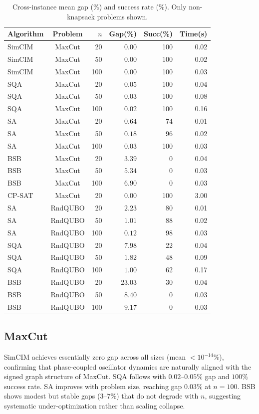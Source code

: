 \documentclass[10pt,twocolumn]{article}
\begin{document}
\begin{table}[t]
\centering
\small
\caption{Cross-instance mean gap (\%) and success rate (\%). Only non-knapsack problems shown.}\label{tab:main}
\begin{tabular}{lcrrrr}
\toprule
Algorithm & Problem & $n$ & Gap(\%) & Succ(\%) & Time(s)\\
\midrule
SimCIM & MaxCut & 20 & $0.00$ & 100 & 0.02 \\
SimCIM & MaxCut & 50 & $0.00$ & 100 & 0.02 \\
SimCIM & MaxCut & 100 & $0.00$ & 100 & 0.03 \\
SQA & MaxCut & 20 & $0.05$ & 100 & 0.04 \\
SQA & MaxCut & 50 & $0.03$ & 100 & 0.08 \\
SQA & MaxCut & 100 & $0.02$ & 100 & 0.16 \\
SA & MaxCut & 20 & $0.64$ & 74 & 0.01 \\
SA & MaxCut & 50 & $0.18$ & 96 & 0.02 \\
SA & MaxCut & 100 & $0.03$ & 100 & 0.03 \\
BSB & MaxCut & 20 & $3.39$ & 0 & 0.04 \\
BSB & MaxCut & 50 & $5.34$ & 0 & 0.03 \\
BSB & MaxCut & 100 & $6.90$ & 0 & 0.03 \\
CP-SAT & MaxCut & 20 & $0.00$ & 100 & 3.00 \\
\addlinespace
SA & RndQUBO & 20 & $2.23$ & 80 & 0.01 \\
SA & RndQUBO & 50 & $1.01$ & 88 & 0.02 \\
SA & RndQUBO & 100 & $0.12$ & 98 & 0.03 \\
SQA & RndQUBO & 20 & $7.98$ & 22 & 0.04 \\
SQA & RndQUBO & 50 & $1.82$ & 48 & 0.09 \\
SQA & RndQUBO & 100 & $1.00$ & 62 & 0.17 \\
BSB & RndQUBO & 20 & $23.03$ & 30 & 0.04 \\
BSB & RndQUBO & 50 & $8.40$ & 0 & 0.03 \\
BSB & RndQUBO & 100 & $9.17$ & 0 & 0.03 \\
\bottomrule
\end{tabular}
\end{table}

\subsection{MaxCut}
SimCIM achieves essentially zero gap across all sizes (mean $<10^{-14}$\%), confirming that phase-coupled oscillator dynamics are naturally aligned with the signed graph structure of MaxCut. SQA follows with $0.02$--$0.05\%$ gap and $100\%$ success rate. SA improves with problem size, reaching gap $0.03\%$ at $n=100$. BSB shows modest but stable gaps ($3$--$7\%$) that do not degrade with $n$, suggesting systematic under-optimization rather than scaling collapse.
\end{document}
